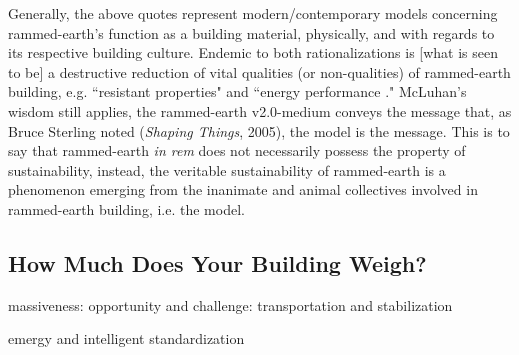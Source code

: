 Generally, the above quotes represent modern/contemporary models concerning rammed-earth's function as a building material, physically, and with regards to its respective building culture. Endemic to both rationalizations is [what is seen to be] a destructive reduction of vital qualities (or non-qualities) of rammed-earth building, e.g. ``resistant properties" and ``energy performance \cite{MOECONVERGENCE}."  McLuhan's wisdom still applies, the rammed-earth v2.0-medium conveys the message that, as Bruce Sterling noted (\textit{Shaping Things}, 2005), the model is the message. This is to say that rammed-earth \textit{in rem} does not necessarily possess the property of sustainability, instead, the veritable sustainability of rammed-earth is a phenomenon emerging from the inanimate and animal collectives involved in rammed-earth building, i.e. the model.

\subsection{How Much Does Your Building Weigh?}

 massiveness: opportunity and challenge: transportation and stabilization

 emergy and intelligent standardization

